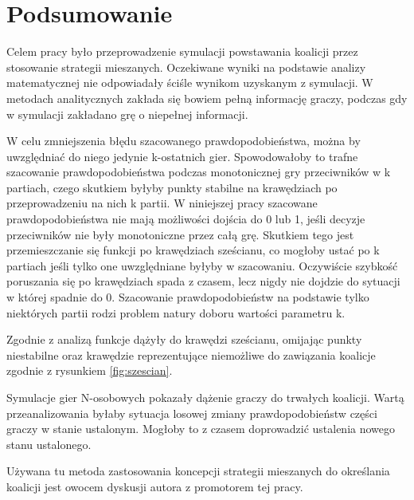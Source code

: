 \chapter{Podsumowanie}
\label{cha:podsumowanie}

Celem pracy było przeprowadzenie symulacji  powstawania koalicji przez stosowanie strategii mieszanych. Oczekiwane wyniki na podstawie analizy matematycznej nie odpowiadały ściśle wynikom uzyskanym z symulacji. W metodach analitycznych zakłada się bowiem pełną informację graczy, podczas gdy w symulacji zakładano grę o niepełnej informacji. 

W celu zmniejszenia błędu szacowanego prawdopodobieństwa, można by uwzględniać do niego jedynie k-ostatnich gier. Spowodowałoby to trafne szacowanie prawdopodobieństwa podczas monotonicznej gry przeciwników w k partiach, czego skutkiem byłyby punkty stabilne na krawędziach po przeprowadzeniu na nich k partii. W niniejszej pracy szacowane prawdopodobieństwa nie mają możliwości dojścia do 0 lub 1, jeśli decyzje przeciwników nie były monotoniczne przez całą grę. Skutkiem tego jest przemieszczanie się funkcji po krawędziach sześcianu, co mogłoby ustać po k partiach jeśli tylko one uwzględniane byłyby w szacowaniu. Oczywiście szybkość poruszania się po krawędziach spada z czasem, lecz nigdy nie dojdzie do sytuacji w której spadnie do 0. Szacowanie prawdopodobieństw na podstawie tylko niektórych partii rodzi problem natury doboru wartości parametru k. 

Zgodnie z analizą funkcje dążyły do krawędzi sześcianu, omijając punkty niestabilne oraz krawędzie reprezentujące niemożliwe do zawiązania koalicje zgodnie z rysunkiem \ref{fig:szescian}.

Symulacje gier N-osobowych pokazały dążenie graczy do trwałych koalicji. Wartą przeanalizowania byłaby sytuacja losowej zmiany prawdopodobieństw części graczy w stanie ustalonym. Mogłoby to z czasem doprowadzić ustalenia nowego stanu ustalonego.

Używana tu metoda zastosowania koncepcji strategii mieszanych do określania koalicji jest owocem dyskusji autora z promotorem tej pracy.
